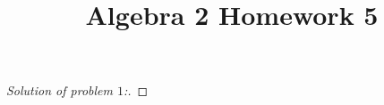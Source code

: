\documentclass[letterpaper,11pt,twoside]{article}
\title{Algebra 2 Homework 5}
\theoremstyle{proposition}
\theoremstyle{definition}
\theoremstyle{theorem}
\theoremstyle{definition}
\theoremstyle{definition}
\theoremstyle{definition}
\theoremstyle{lemma}
\theoremstyle{definition}
\theoremstyle{definition}
\theoremstyle{corollary}
\theoremstyle{definition}
\theoremstyle{definition}
\theoremstyle{definition}
\begin{document}
	\maketitle
	\begin{proof}[Solution of problem $1$:]
		
	\end{proof}
\end{document}
